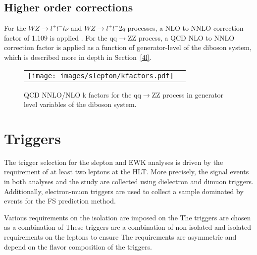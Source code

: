 \subsection{Higher order corrections}
\label{higherOrderCorr}
For the $WZ\rightarrow  l^{+}l^{-} l\nu$ and $WZ\rightarrow  l^{+}l^{-}2q$ processes, a NLO to NNLO correction factor of 1.109 is applied \cite{Grazzini:2016swo}. For the qq$\rightarrow$ZZ 
process, a QCD NLO to NNLO correction factor is applied as a function of generator-level \pt of the diboson system, which is described more in depth in Section~\ref{4l}.
\begin{figure}[!h]
\begin{center}
\begin{tabular}{cc}
\texttt{[image: images/slepton/kfactors.pdf]} \\
\end{tabular}
\caption{QCD NNLO/NLO k factors for the qq$\rightarrow$ZZ process in generator level variables of the diboson system. }
\label{fig:ZZkfactor}
\end{center}
\end{figure}                                                                                                                                                                                


\section{Triggers}
The trigger selection for the slepton and EWK analyses is driven by the requirement of at least two leptons at the HLT.
More precisely, the signal events in both analyses and the \ptmiss study are collected using dielectron and dimuon triggers.
Additionally, electron-muon triggers are used to collect a sample dominated by \ttbar events for the FS prediction method.

Various requirements on the isolation are imposed on the
The triggers are chosen as a combination of
These triggers are a combination of non-isolated and isolated requirements on the leptons to ensure
The \pt requirements are asymmetric and depend on the flavor composition of the triggers.

